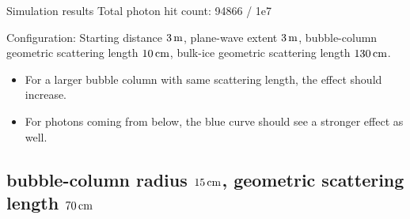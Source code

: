 \begin{frame}[fragile]{Simulation results}
  \tiny Total photon hit count: 94866 / 1e7

  \tiny Configuration: Starting distance $3\text{\,m}$, plane-wave extent $3\text{\,m}$, bubble-column geometric scattering length $10\text{\,cm}$, bulk-ice geometric scattering length $130\text{\,cm}$.
  \normalsize

  \begin{itemize}
    \item For a larger bubble column with same scattering length, the effect should increase. \checkmark
    \item For photons coming from below, the blue curve should see a stronger effect as well. \checkmark
  \end{itemize}
\end{frame}

\subsection{bubble-column radius $15\text{\,cm}$, geometric scattering length $70\text{\,cm}$}

